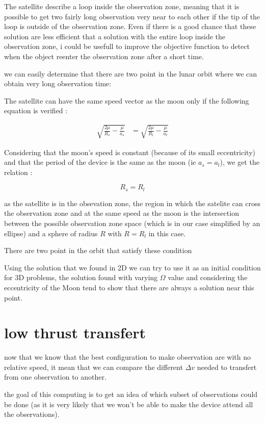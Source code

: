 \documentclass{article} %
\begin{document}
		The satellite describe a loop inside the observation zone, meaning that it is possible to get two fairly long observation very near to each other if the tip of the loop is outside of the observation zone. Even if there is a good chance that these solution are less efficient that a solution with the entire loop inside the observation zone, i could be usefull to improve the objective function to detect when the object reenter the observation zone after a short time.
		
		we can easily determine that there are two point in the lunar orbit where we can obtain very long observation time:
		
		The satellite can have the same speed vector as the moon only if the following equation is verified : 
		
		$$
		\begin{align}
			\sqrt{\frac{2\mu}{R_s}-\frac{\mu}{a_s}}&=\sqrt{\frac{2\mu}{R_l}-\frac{\mu}{a_l}}
		\end{align}
		$$
		
		Considering that the moon's speed is constant (because of its small eccentricity) and that the period of the device is the same as the moon (ie $a_s=a_l$), we get the relation :
		
		$$
		R_s=R_l
		$$
		
		as the satellite is in the obsevation zone, the region in which the satelite can cross the observation zone and at the same speed as the moon is the intersection between the possible observation zone space (which is in our case simplified by an ellipse) and a sphere of radius $R$ with $R=R_l$ in this case.
		
		There are two point in the orbit that satisfy these condition
		
		Using the solution that we found in 2D we can try to use it as an initial condition for 3D problems, the solution found with varying $\Omega$ value and considering the eccentricity of the Moon tend to show that there are always a solution near this point.
		
		\section{low thrust transfert}
		
		now that we know that the best configuration to make observation are with no relative speed, it mean that we can compare the different $\Delta v$ needed to transfert from one observation to another.
		
		the goal of this computing is to get an idea of which subset of observations could be done (as it is very likely that we won't be able to make the device attend all the observations).
		
\end{document}
